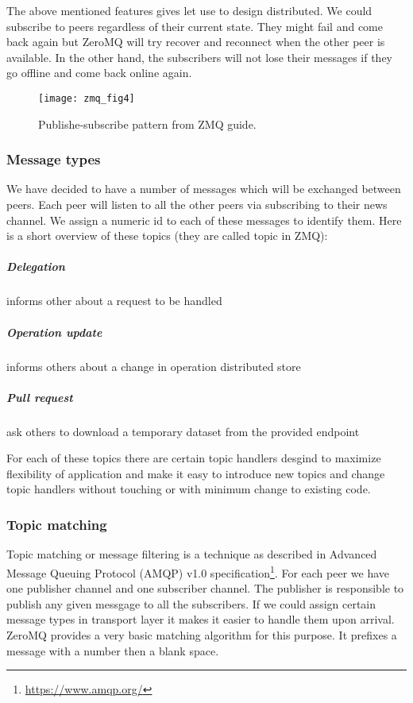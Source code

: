 The above mentioned features gives let use to design distributed.
We could subscribe to peers regardless of their current state. 
They might fail and come back again but ZeroMQ will try recover and reconnect when the other peer is available.
In the other hand, the subscribers will not lose their messages if they go offline and come back online again.

\begin{figure}[h]
  \centering
  \texttt{[image: zmq\_fig4]}
  \caption[Publish-subscribe pattern.]
   {Publishe-subscribe pattern from ZMQ guide. \cite{zguide}}
\end{figure}

\subsubsection{Message types}
We have decided to have a number of messages which will be exchanged between peers.
Each peer will listen to all the other peers via subscribing to their news channel.
We assign a numeric id to each of these messages to identify them. 
Here is a short overview of these topics (they are called topic in ZMQ):

\subparagraph{Delegation} informs other about a request to be handled
\subparagraph{Operation update} informs others about a change in operation distributed store
\subparagraph{Pull request} ask others to download a temporary dataset from the provided endpoint

For each of these topics there are certain topic handlers desgind to maximize flexibility of application and
make it easy to introduce new topics and change topic handlers without touching or with minimum change to existing code.

\subsubsection{Topic matching}
Topic matching or message filtering is a technique as described 
in Advanced Message Queuing Protocol (AMQP) v1.0 specification\footnote{\url{https://www.amqp.org/}}.
For each peer we have one publisher channel and one subscriber channel. 
The publisher is responsible to publish any given messgage to all the subscribers.
If we could assign certain message types in transport layer it makes it easier
to handle them upon arrival. 
ZeroMQ provides a very basic matching algorithm for this purpose.
It prefixes a message with a number then a blank space. 

